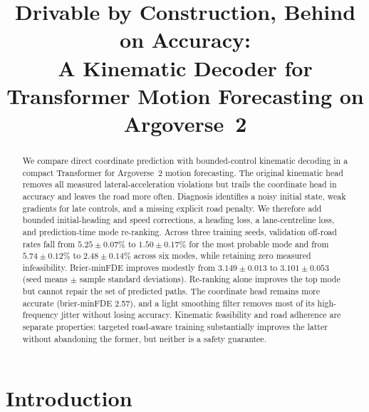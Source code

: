 \documentclass[conference]{IEEEtran}
\begin{document}
\title{Drivable by Construction, Behind on Accuracy:\\
A Kinematic Decoder for Transformer Motion Forecasting on Argoverse~2}

\author{
}

\maketitle
\thispagestyle{plain}

\begin{abstract}
We compare direct coordinate prediction with bounded-control kinematic decoding in a compact
Transformer for Argoverse~2 motion forecasting. The original kinematic head removes all measured
lateral-acceleration violations but trails the coordinate head in accuracy and leaves the road
more often. Diagnosis identifies a noisy initial state, weak gradients for late controls, and a
missing explicit road penalty. We therefore add bounded initial-heading and speed corrections,
a heading loss, a lane-centreline loss, and prediction-time mode re-ranking. Across three training seeds, validation off-road rates fall from $5.25\pm0.07\%$ to
$1.50\pm0.17\%$ for the most probable mode and from $5.74\pm0.12\%$ to $2.48\pm0.14\%$
across six modes, while retaining zero measured infeasibility. Brier-minFDE improves modestly
from $3.149\pm0.013$ to $3.101\pm0.053$ (seed means $\pm$ sample standard deviations). Re-ranking alone improves the top mode but cannot repair the set of
predicted paths. The coordinate head remains more accurate (brier-minFDE 2.57), and a light smoothing
filter removes most of its high-frequency jitter without losing accuracy. Kinematic feasibility
and road adherence are separate properties: targeted road-aware training substantially improves
the latter without abandoning the former, but neither is a safety guarantee.
\end{abstract}

\section{Introduction}
\end{document}
